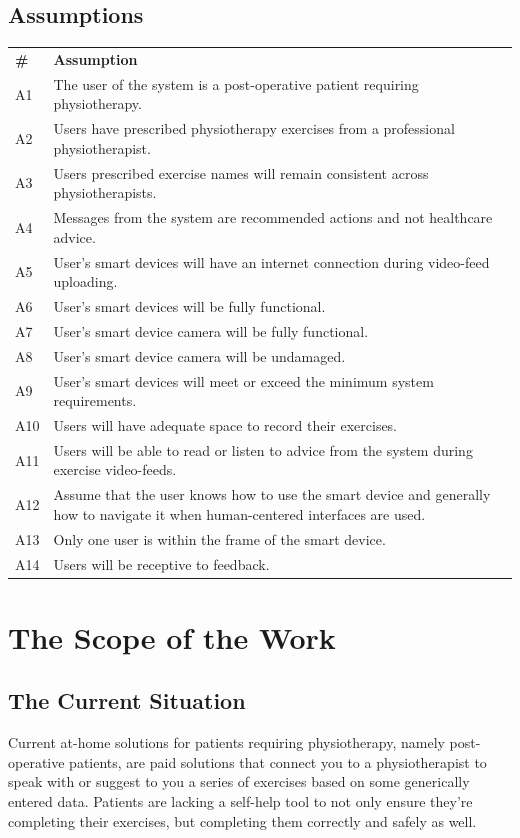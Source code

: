 \documentclass[12pt]{article}
\begin{document}
\subsection{Assumptions}
\begin{table}[H]
\begin{tabular}{l m{10cm}}
  \textbf{\#} & \textbf{Assumption} \\
  A1 & The user of the system is a post-operative patient requiring physiotherapy. \\
  A2 & Users have prescribed physiotherapy exercises from a professional physiotherapist. \\
  A3 & Users prescribed exercise names will remain consistent across physiotherapists. \\
  A4 & Messages from the system are recommended actions and not healthcare advice. \\
  A5 & User’s smart devices will have an internet connection during video-feed uploading. \\
  A6 & User’s smart devices will be fully functional. \\
  A7 & User’s smart device camera will be fully functional. \\
  A8 & User’s smart device camera will be undamaged. \\
  A9 & User’s smart devices will meet or exceed the minimum system requirements. \\
  A10 & Users will have adequate space to record their exercises. \\
  A11 & Users will be able to read or listen to advice from the system during exercise video-feeds. \\
  A12 & Assume that the user knows how to use the smart device and generally how to navigate it when human-centered interfaces are used. \\
  A13 & Only one user is within the frame of the smart device. \\
  A14 & Users will be receptive to feedback.
\end{tabular}
\end{table}

\section{The Scope of the Work}
\subsection{The Current Situation}
Current at-home solutions for patients requiring physiotherapy, namely post-operative patients, are paid solutions that connect you to a physiotherapist to speak with or suggest to you a series of exercises based on some generically entered data. Patients are lacking a self-help tool to not only ensure they’re completing their exercises, but completing them correctly and safely as well.
\end{document}
